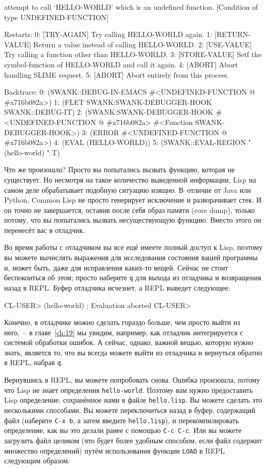 \begin{myverb}
attempt to call `HELLO-WORLD' which is an undefined function.
   [Condition of type UNDEFINED-FUNCTION]

Restarts:
   0: [TRY-AGAIN] Try calling HELLO-WORLD again.
   1: [RETURN-VALUE] Return a value instead of calling HELLO-WORLD.
   2: [USE-VALUE] Try calling a function other than HELLO-WORLD.
   3: [STORE-VALUE] Setf the symbol-function of HELLO-WORLD and call it again.
   4: [ABORT] Abort handling SLIME request.
   5: [ABORT] Abort entirely from this process.

Backtrace:
  0: (SWANK::DEBUG-IN-EMACS #<UNDEFINED-FUNCTION @ #x716b082a>)
  1: (FLET SWANK:SWANK-DEBUGGER-HOOK SWANK::DEBUG-IT)
  2: (SWANK:SWANK-DEBUGGER-HOOK #<UNDEFINED-FUNCTION @ #x716b082a> 
                                #<Function SWANK-DEBUGGER-HOOK>)
  3: (ERROR #<UNDEFINED-FUNCTION @ #x716b082a>)
  4: (EVAL (HELLO-WORLD))
  5: (SWANK::EVAL-REGION "(hello-world)
" T)
\end{myverb}

Что же произошло? Просто вы попытались вызвать функцию, которая не сущес\-твует. Но несмотря
на такое количество выведенной информации, Lisp на самом деле обрабатывает подобную ситуацию
изящно. В~отличие от Java или Python, Common Lisp не просто генерирует исключение и
разворачивает стек. И он точно не завершается, оставив после себя образ памяти (core
dump), только потому, что вы попытались вызвать несуществующую функцию. Вместо этого он
перенесёт вас в отладчик.

Во время работы с отладчиком вы все ещё имеете полный доступ к Lisp, поэтому вы можете
вычислять выражения для исследования состояния вашей программы и, может быть, даже для
исправления каких-то вещей. Сейчас не стоит беспокоиться об этом; просто наберите \texttt{q} для
выхода из отладчика и возвращения назад в REPL. Буфер отладчика исчезнет, а REPL выведет
следующее:

\begin{myverb}
CL-USER> (hello-world) 
; Evaluation aborted
CL-USER>
\end{myverb}

Конечно, в отладчике можно сделать гораздо больше, чем просто выйти из него,~-- в
главе~\ref{ch:19} мы увидим, например, как отладчик интегрируется с системой обработки
ошибок.  А сейчас, однако, важной вещью, которую нужно знать, является то, что вы всегда
можете выйти из отладчика и вернуться обратно в REPL, набрав \texttt{q}.

Вернувшись в REPL, вы можете попробовать снова. Ошибка произошла, потому что Lisp не знает
определения \lstinline{hello-world}. Поэтому вам нужно предоставить Lisp определение, сохранённое нами
в файле \texttt{hello.lisp}. Вы можете сделать это несколькими способами. Вы можете переключиться
назад в буфер, содержащий файл (наберите \texttt{C-x b}, а затем введите \texttt{hello.lisp}), и
перекомпилировать определение, как вы это делали ранее с помощью \texttt{C-c C-c}. Или вы можете
загрузить файл целиком (что будет более удобным способом, если файл содержит множество
определений) путём использования функции \lstinline{LOAD} в REPL следующим образом:

